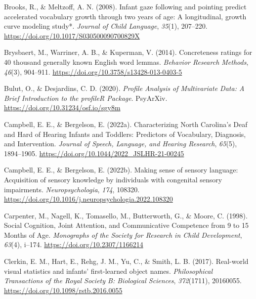 \documentclass[
  man,floatsintext]{apa6}
\newlength{\cslhangindent}
\newlength{\cslentryspacingunit} %
\newenvironment{CSLReferences}[2] %
 {%
  \setlength{\parindent}{0pt}
  \ifodd #1
  \let\oldpar\par
  \def\par{\hangindent=\cslhangindent\oldpar}
  \fi
  \setlength{\parskip}{#2\cslentryspacingunit}
 }%
 {}
\begin{document}
\begin{CSLReferences}{1}{0}
\leavevmode{}%
Brooks, R., \& Meltzoff, A. N. (2008). Infant gaze following and pointing predict accelerated vocabulary growth through two years of age: A longitudinal, growth curve modeling study*. \emph{Journal of Child Language}, \emph{35}(1), 207--220. \url{https://doi.org/10.1017/S030500090700829X}

\leavevmode{}%
Brysbaert, M., Warriner, A. B., \& Kuperman, V. (2014). Concreteness ratings for 40 thousand generally known {English} word lemmas. \emph{Behavior Research Methods}, \emph{46}(3), 904--911. \url{https://doi.org/10.3758/s13428-013-0403-5}

\leavevmode{}%
Bulut, O., \& Desjardins, C. D. (2020). \emph{Profile {Analysis} of {Multivariate Data}: {A Brief Introduction} to the {profileR Package}}. {PsyArXiv}. \url{https://doi.org/10.31234/osf.io/sgy8m}

\leavevmode{}%
Campbell, E. E., \& Bergelson, E. (2022a). Characterizing {North Carolina}'s {Deaf} and {Hard} of {Hearing Infants} and {Toddlers}: {Predictors} of {Vocabulary}, {Diagnosis}, and {Intervention}. \emph{Journal of Speech, Language, and Hearing Research}, \emph{65}(5), 1894--1905. \url{https://doi.org/10.1044/2022_JSLHR-21-00245}

\leavevmode{}%
Campbell, E. E., \& Bergelson, E. (2022b). Making sense of sensory language: {Acquisition} of sensory knowledge by individuals with congenital sensory impairments. \emph{Neuropsychologia}, \emph{174}, 108320. \url{https://doi.org/10.1016/j.neuropsychologia.2022.108320}

\leavevmode{}%
Carpenter, M., Nagell, K., Tomasello, M., Butterworth, G., \& Moore, C. (1998). Social {Cognition}, {Joint Attention}, and {Communicative Competence} from 9 to 15 {Months} of {Age}. \emph{Monographs of the Society for Research in Child Development}, \emph{63}(4), i--174. \url{https://doi.org/10.2307/1166214}

\leavevmode{}%
Clerkin, E. M., Hart, E., Rehg, J. M., Yu, C., \& Smith, L. B. (2017). Real-world visual statistics and infants' first-learned object names. \emph{Philosophical Transactions of the Royal Society B: Biological Sciences}, \emph{372}(1711), 20160055. \url{https://doi.org/10.1098/rstb.2016.0055}


\end{CSLReferences}
\end{document}
